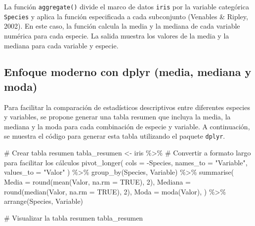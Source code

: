 \documentclass[
  spanish,
  a4paper,
  DIV=11,
  numbers=noendperiod,
  onepage,
  openany]{scrreprt}
\newenvironment{Shaded}{\begin{snugshade}}{\end{snugshade}}
\newcommand{\AttributeTok}[1]{\textcolor[rgb]{0.40,0.45,0.13}{#1}}
\newcommand{\CommentTok}[1]{\textcolor[rgb]{0.37,0.37,0.37}{#1}}
\newcommand{\ConstantTok}[1]{\textcolor[rgb]{0.56,0.35,0.01}{#1}}
\newcommand{\DecValTok}[1]{\textcolor[rgb]{0.68,0.00,0.00}{#1}}
\newcommand{\FunctionTok}[1]{\textcolor[rgb]{0.28,0.35,0.67}{#1}}
\newcommand{\NormalTok}[1]{\textcolor[rgb]{0.00,0.23,0.31}{#1}}
\newcommand{\OtherTok}[1]{\textcolor[rgb]{0.00,0.23,0.31}{#1}}
\newcommand{\SpecialCharTok}[1]{\textcolor[rgb]{0.37,0.37,0.37}{#1}}
\newcommand{\StringTok}[1]{\textcolor[rgb]{0.13,0.47,0.30}{#1}}
\begin{document}
La función \texttt{aggregate()} divide el marco de datos \texttt{iris}
por la variable categórica \texttt{Species} y aplica la función
especificada a cada subconjunto (Venables \& Ripley, 2002). En este
caso, la función calcula la media y la mediana de cada variable numérica
para cada especie. La salida muestra los valores de la media y la
mediana para cada variable y especie.

\subsection{Enfoque moderno con dplyr (media, mediana y
moda)}\label{enfoque-moderno-con-dplyr-media-mediana-y-moda}

Para facilitar la comparación de estadísticos descriptivos entre
diferentes especies y variables, se propone generar una tabla resumen
que incluya la media, la mediana y la moda para cada combinación de
especie y variable. A continuación, se muestra el código para generar
esta tabla utilizando el paquete \texttt{dplyr}.

\begin{Shaded}
\begin{Highlighting}[]
\CommentTok{\# Crear tabla resumen }
\NormalTok{tabla\_resumen }\OtherTok{\textless{}{-}}\NormalTok{ iris }\SpecialCharTok{\%\textgreater{}\%}
  \CommentTok{\# Convertir a formato largo para facilitar los cálculos}
  \FunctionTok{pivot\_longer}\NormalTok{(}
    \AttributeTok{cols =} \SpecialCharTok{{-}}\NormalTok{Species,}
    \AttributeTok{names\_to =} \StringTok{"Variable"}\NormalTok{,}
    \AttributeTok{values\_to =} \StringTok{"Valor"}
\NormalTok{  ) }\SpecialCharTok{\%\textgreater{}\%}
  \FunctionTok{group\_by}\NormalTok{(Species, Variable) }\SpecialCharTok{\%\textgreater{}\%}
  \FunctionTok{summarise}\NormalTok{(}
    \AttributeTok{Media =} \FunctionTok{round}\NormalTok{(}\FunctionTok{mean}\NormalTok{(Valor, }\AttributeTok{na.rm =} \ConstantTok{TRUE}\NormalTok{), }\DecValTok{2}\NormalTok{),}
    \AttributeTok{Mediana =} \FunctionTok{round}\NormalTok{(}\FunctionTok{median}\NormalTok{(Valor, }\AttributeTok{na.rm =} \ConstantTok{TRUE}\NormalTok{), }\DecValTok{2}\NormalTok{),}
    \AttributeTok{Moda =} \FunctionTok{moda}\NormalTok{(Valor),}
\NormalTok{  ) }\SpecialCharTok{\%\textgreater{}\%}
  \FunctionTok{arrange}\NormalTok{(Species, Variable)}

\CommentTok{\# Visualizar la tabla resumen}
\NormalTok{tabla\_resumen}
\end{Highlighting}
\end{Shaded}
\end{document}
